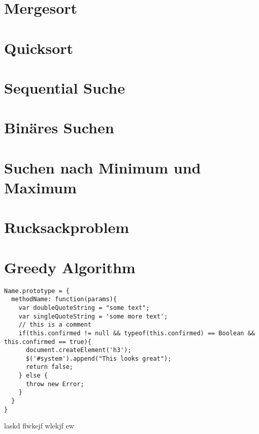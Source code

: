 \documentclass{book}
\begin{document}
\section{Mergesort}
\section{Quicksort}
\section{Sequential Suche}
\section{Binäres Suchen}
\section{Suchen nach Minimum und Maximum}
\section{Rucksackproblem}
\section{Greedy Algorithm}

\medskip
\begin{lstlisting}[caption=My Javascript Example]
Name.prototype = {
  methodName: function(params){
    var doubleQuoteString = "some text";
    var singleQuoteString = 'some more text';
    // this is a comment
    if(this.confirmed != null && typeof(this.confirmed) == Boolean && this.confirmed == true){
      document.createElement('h3');
      $('#system').append("This looks great");
      return false;
    } else {
      throw new Error;
    }
  }
}
\end{lstlisting}
laskd flwkejf wlekjf ew
\end{document}
